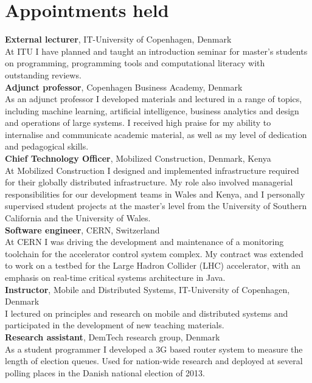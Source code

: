\documentclass[11pt, a4paper]{article}
\newcommand{\years}[1]{\marginnote{\scriptsize #1}}
\begin{document}
\section*{Appointments held}
\noindent
\years{2018-}\textbf{External lecturer}, IT-University of Copenhagen, Denmark\\
At ITU I have planned and taught an introduction seminar for master's students
on programming, programming tools and computational literacy with outstanding reviews. \\[0.5cm]
\years{2016-}\textbf{Adjunct professor}, Copenhagen Business Academy,
Denmark\\
As an adjunct professor I developed materials and lectured in
a range of topics, including machine learning, artificial intelligence, business
analytics and design and operations of large systems.
I received high praise for my ability to internalise and communicate academic
material, as well as my level of dedication and pedagogical skills.\\[0.5cm]
\years{2016-}\textbf{Chief Technology Officer}, Mobilized Construction, Denmark, Kenya\\
At Mobilized Construction I designed and implemented infrastructure required for
their globally distributed infrastructure.
My role also involved managerial responsibilities for our development teams in 
Wales and Kenya, and I personally supervised student
projects at the master's level from the University of Southern
California and the University of Wales.\\[0.5cm]
\years{2014-2016}\textbf{Software engineer}, CERN, Switzerland\\
At CERN I was driving the development and maintenance of
a monitoring toolchain for the accelerator control system complex.
My contract was extended to work on a testbed for the Large Hadron
Collider (LHC) accelerator, with an emphasis on real-time critical
systems architecture in Java. \\[0.5cm]
\years{2013}\textbf{Instructor}, Mobile and Distributed Systems, IT-University of
Copenhagen, Denmark\\
I lectured on principles and research on mobile and distributed
systems and participated in the development of new teaching
materials. \\[0.5cm]
\years{2012-2014}\textbf{Research assistant}, DemTech research group, Denmark\\
As a student programmer I developed a 3G based router system to
measure the length of election queues. Used for nation-wide
research and deployed at several polling places in the Danish national
election of 2013.
\end{document}

